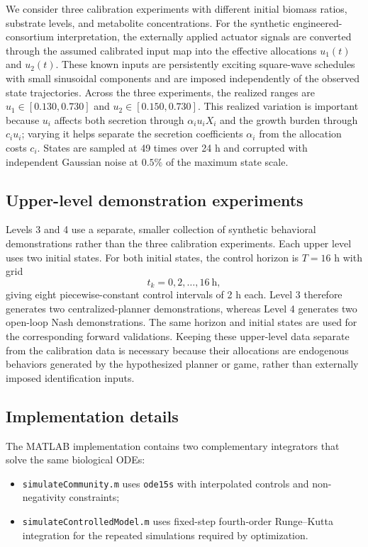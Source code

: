 \documentclass[11pt,a4paper]{article}
\begin{document}
We consider three calibration experiments with different initial biomass ratios, substrate
levels, and metabolite concentrations. For the synthetic engineered-consortium
interpretation, the externally applied actuator signals are converted through
the assumed calibrated input map into the effective allocations \(u_1(t)\)
and \(u_2(t)\). These known inputs are persistently exciting square-wave
schedules with small sinusoidal components and are imposed independently of
the observed state trajectories. Across the three experiments, the realized
ranges are \(u_1\in[0.130,0.730]\) and \(u_2\in[0.150,0.730]\). %
This realized
variation is important because \(u_i\) affects both secretion through
\(\alpha_i u_iX_i\) and the growth burden through \(c_i u_i\); varying it
helps separate the secretion coefficients \(\alpha_i\) from the allocation
costs \(c_i\). States are sampled at 49 times over 24 h and corrupted
with independent Gaussian noise at \(0.5\%\) of the maximum state scale. 

\subsection{Upper-level demonstration experiments}

Levels 3 and 4 use a separate, smaller collection of synthetic behavioral
demonstrations rather than the three calibration experiments. Each upper
level uses two initial states. For both initial states, the control horizon is
\(T=16\) h with grid
\[
  t_k=0,2,\ldots,16\ \text{h},
\]
giving eight piecewise-constant control intervals of 2 h each. Level 3
therefore generates two centralized-planner demonstrations, whereas Level 4
generates two open-loop Nash demonstrations. The same horizon and initial
states are used for the corresponding forward validations. Keeping these
upper-level data separate from the calibration data is necessary because
their allocations are endogenous behaviors generated by the hypothesized
planner or game, rather than externally imposed identification inputs.

\subsection{Implementation details}

The MATLAB implementation contains two complementary integrators that solve
the same biological ODEs:
\begin{itemize}
  \item \texttt{simulateCommunity.m} uses \texttt{ode15s} with interpolated
        controls and non-negativity constraints;
  \item \texttt{simulateControlledModel.m} uses fixed-step fourth-order
        Runge--Kutta integration for the repeated simulations required by
        optimization.
\end{itemize}
\end{document}
